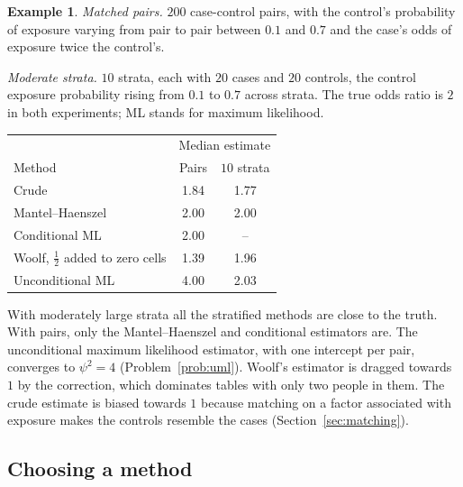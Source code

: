 \documentclass[11pt,a4paper]{article}
\numberwithin{equation}{section}
\theoremstyle{definition}
\newtheorem{exa}[thm]{Example}
\begin{document}
\begin{exa}
\label{exa:sim}
\emph{Matched pairs.} $200$ case-control pairs, with the control's probability of exposure varying from pair to pair between $0.1$ and $0.7$ and
the case's odds of exposure twice the control's.

\emph{Moderate strata.} $10$ strata, each with $20$ cases and $20$ controls, the control exposure probability rising from $0.1$ to $0.7$ across strata. The true odds ratio is $2$ in both experiments; ML stands for maximum likelihood.

\begin{center}
\begin{tabular}{lcc}
\hline
 & \multicolumn{2}{c}{Median estimate} \\
Method & Pairs & $10$ strata \\
\hline
Crude & 1.84 & 1.77 \\
Mantel--Haenszel & 2.00 & 2.00 \\
Conditional ML & 2.00 & -- \\
Woolf, $\tfrac12$ added to zero cells & 1.39 & 1.96 \\
Unconditional ML & 4.00 & 2.03 \\
\hline
\end{tabular}
\end{center}
With moderately large strata all the stratified methods are close to the truth. With pairs, only the Mantel--Haenszel and conditional
estimators are. The unconditional maximum likelihood estimator, with one intercept per pair, converges to $\psi^2 = 4$
(Problem~\ref{prob:uml}). Woolf's estimator is dragged towards $1$ by the correction, which dominates tables with only two people in them.
The crude estimate is biased towards $1$ because matching on a factor associated with exposure makes the controls resemble the cases
(Section~\ref{sec:matching}).
\end{exa}

\subsection{Choosing a method}
\end{document}
